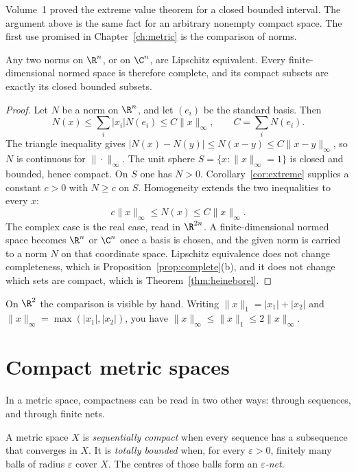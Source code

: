 Volume~1 proved the extreme value theorem for a closed bounded interval. The argument above is the same fact for an arbitrary nonempty compact space. The first use promised in Chapter~\ref{ch:metric} is the comparison of norms.

\begin{corollary}\label{cor:norms}
Any two norms on $\R^n$, or on $\C^n$, are Lipschitz equivalent. Every finite-dimensional normed space is therefore complete, and its compact subsets are exactly its closed bounded subsets.
\end{corollary}
\begin{proof}
Let $N$ be a norm on $\R^n$, and let $(e_i)$ be the standard basis. Then
\[N(x)\le\sum_i|x_i|N(e_i)\le C\|x\|_\infty,\qquad C=\sum_i N(e_i).\]
The triangle inequality gives $|N(x)-N(y)|\le N(x-y)\le C\|x-y\|_\infty$, so $N$ is continuous for $\|\cdot\|_\infty$. The unit sphere $S=\{x:\|x\|_\infty=1\}$ is closed and bounded, hence compact. On $S$ one has $N>0$. Corollary~\ref{cor:extreme} supplies a constant $c>0$ with $N\ge c$ on $S$. Homogeneity extends the two inequalities to every $x$:
\[c\|x\|_\infty\le N(x)\le C\|x\|_\infty.\]
The complex case is the real case, read in $\R^{2n}$. A finite-dimensional normed space becomes $\R^n$ or $\C^n$ once a basis is chosen, and the given norm is carried to a norm $N$ on that coordinate space. Lipschitz equivalence does not change completeness, which is Proposition~\ref{prop:complete}(b), and it does not change which sets are compact, which is Theorem~\ref{thm:heineborel}.
\end{proof}

On $\R^2$ the comparison is visible by hand. Writing $\|x\|_1=|x_1|+|x_2|$ and $\|x\|_\infty=\max(|x_1|,|x_2|)$, you have $\|x\|_\infty\le\|x\|_1\le 2\|x\|_\infty$.

\section{Compact metric spaces}

In a metric space, compactness can be read in two other ways: through sequences, and through finite nets.

\begin{definition}
A metric space $X$ is \emph{sequentially compact} when every sequence has a subsequence that converges in $X$. It is \emph{totally bounded} when, for every $\varepsilon>0$, finitely many balls of radius $\varepsilon$ cover $X$. The centres of those balls form an \emph{$\varepsilon$-net}.
\end{definition}

